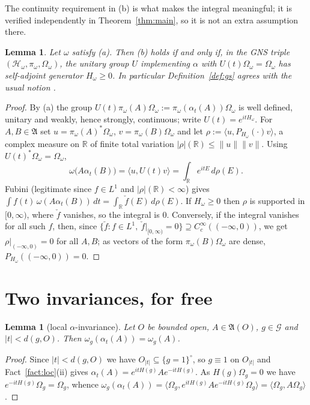 \documentclass[11pt,a4paper]{article}
\theoremstyle{plain}
\newtheorem{lemma}[theorem]{Lemma}
\theoremstyle{definition}
\newcommand{\A}{\mathfrak{A}}
\newcommand{\HH}{\mathcal{H}}
\newcommand{\G}{\mathcal{G}}
\newcommand{\R}{\mathbb{R}}
\newcommand{\Om}{\Omega}
\newcommand{\ip}[2]{\langle #1,#2\rangle}
\begin{document}
The continuity requirement in (b) is what makes the integral meaningful; it is verified
independently in Theorem~\ref{thm:main}, so it is not an extra assumption there.

\begin{lemma}\label{lem:gsGNS}
Let $\omega$ satisfy \textup{(a)}. Then \textup{(b)} holds if and only if, in the GNS triple
$(\HH_\omega,\pi_\omega,\Om_\omega)$, the unitary group $U$ implementing $\alpha$ with
$U(t)\Om_\omega=\Om_\omega$ has self-adjoint generator $H_\omega\ge0$. In particular
Definition~\ref{def:gs} agrees with the usual notion \cite[Def.~5.3.18]{BR2}.
\end{lemma}

\begin{proof}
By (a) the group $U(t)\pi_\omega(A)\Om_\omega:=\pi_\omega(\alpha_t(A))\Om_\omega$ is well defined,
unitary and weakly, hence strongly, continuous; write $U(t)=e^{itH_\omega}$. For $A,B\in\A$ set
$u=\pi_\omega(A)^*\Om_\omega$, $v=\pi_\omega(B)\Om_\omega$ and let $\rho:=\ip{u}{P_{H_\omega}(\cdot)v}$,
a complex measure on $\R$ of finite total variation $|\rho|(\R)\le\|u\|\|v\|$. Using
$U(t)^*\Om_\omega=\Om_\omega$,
\[
  \omega\bigl(A\alpha_t(B)\bigr)=\ip{u}{U(t)v}=\int_\R e^{itE}\,d\rho(E).
\]
Fubini (legitimate since $f\in L^1$ and $|\rho|(\R)<\infty$) gives
$\int f(t)\,\omega(A\alpha_t(B))\,dt=\int_\R\check f(E)\,d\rho(E)$.
If $H_\omega\ge0$ then $\rho$ is supported in $[0,\infty)$, where $\check f$ vanishes, so the
integral is $0$. Conversely, if the integral vanishes for all such $f$, then, since
$\{\check f: f\in L^1,\ \check f|_{[0,\infty)}=0\}\supseteq C_c^\infty((-\infty,0))$, we get
$\rho|_{(-\infty,0)}=0$ for all $A,B$; as vectors of the form $\pi_\omega(B)\Om_\omega$ are dense,
$P_{H_\omega}((-\infty,0))=0$.
\end{proof}

\section{Two invariances, for free}\label{sec:inv}

\begin{lemma}[local $\alpha$-invariance]\label{lem:localinv}
Let $O$ be bounded open, $A\in\A(O)$, $g\in\G$ and $|t|<d(g,O)$. Then
$\omega_g(\alpha_t(A))=\omega_g(A)$.
\end{lemma}

\begin{proof}
Since $|t|<d(g,O)$ we have $O_{|t|}\subseteq\{g=1\}^\circ$, so $g\equiv1$ on $O_{|t|}$ and
Fact~\ref{fact:loc}(ii) gives $\alpha_t(A)=e^{itH(g)}Ae^{-itH(g)}$. As $H(g)\Om_g=0$ we have
$e^{-itH(g)}\Om_g=\Om_g$, whence
$\omega_g(\alpha_t(A))=\ip{\Om_g}{e^{itH(g)}Ae^{-itH(g)}\Om_g}=\ip{\Om_g}{A\Om_g}$.
\end{proof}
\end{document}
